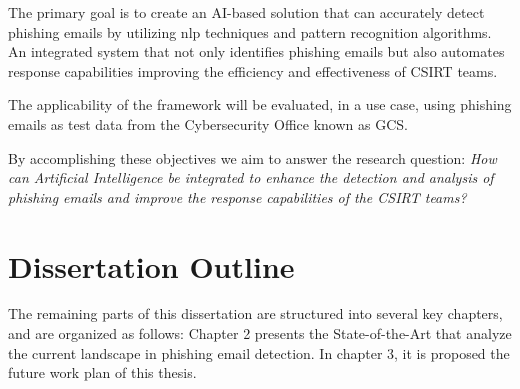 The primary goal is to create an AI-based solution that can accurately detect phishing emails by utilizing \ac{nlp} techniques and pattern recognition algorithms. An integrated system that not only identifies phishing emails but also automates response capabilities improving the efficiency and effectiveness of CSIRT teams.

The applicability of the framework will be evaluated, in a use case, using phishing emails as test data from the Cybersecurity Office known as GCS.


By accomplishing these objectives we aim to answer the research question:
\textit{How can Artificial Intelligence be integrated to enhance the detection and analysis of phishing emails and improve the response capabilities of the CSIRT teams?}

\section{Dissertation Outline}

The remaining parts of this dissertation are structured into several key chapters, and are organized as follows: Chapter 2 presents the State-of-the-Art that analyze the current landscape in phishing email detection. In chapter 3, it is proposed the future work plan of this thesis. 